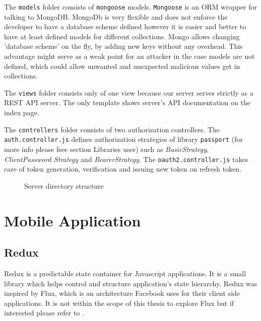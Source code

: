 \documentclass[thesis=M,english]{FITthesis}[2012/10/20]
\begin{document}
The \verb|models| folder consists of \verb|mongoose| models. \verb|Mongoose| is an ORM wrapper for talking to MongoDB. MongoDb is very flexible and does not enforce the developer to have a database scheme defined however it is easier and better to have at least defined models for different collections. Mongo allows changing 'database scheme' on the fly, by adding new keys without any overhead. This advantage might serve as a weak point for an attacker in the case models are not defined, which could allow unwanted and unexpected malicious values get in collections.

The \verb|views| folder consists only of one view because our server serves strictly as a REST API server. The only template shows server's API documentation on the index page.

The \verb|controllers| folder consists of two authorization controllers. The \verb|auth.controller.js| defines authorization strategies of library \verb|passport| (for more info please fsee section Libraries user) such as \textit{BasicStrategy}, \textit{ClientPassword Strategy} and \textit{BearerStrategy}. The \verb|oauth2.controller.js| takes care of token generation, verification and issuing new token on refresh token.

\begin{figure}
	\caption{Server directory structure}	
	\label{fig:server_dir}
\end{figure}

\newpage
\section{Mobile Application}

\subsection{Redux}
\label{redux-section}
Redux is a predictable state container for Javascript applications. It is a small library which helps control and structure application's state hierarchy. Redux was inspired by Flux, which is an architecture Facebook uses for  their client side applications. It is not within the scope of this thesis to explore Flux but if interested please refer to \cite{fb-flux}. 
\end{document}
